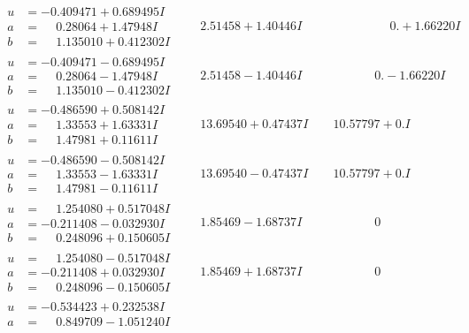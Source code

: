 \documentclass[1p]{elsarticle_modified}
\theoremstyle{definition}
\begin{document}
$$\begin{array}{c|c|c}
\begin{aligned}
u &= -0.409471 + 0.689495 I \\
a &= \phantom{-}0.28064 + 1.47948 I \\
b &= \phantom{-}1.135010 + 0.412302 I\end{aligned}
 & \phantom{-}2.51458 + 1.40446 I & \phantom{-0.000000 -}0. + 1.66220 I \\ \hline\begin{aligned}
u &= -0.409471 - 0.689495 I \\
a &= \phantom{-}0.28064 - 1.47948 I \\
b &= \phantom{-}1.135010 - 0.412302 I\end{aligned}
 & \phantom{-}2.51458 - 1.40446 I & \phantom{-0.000000 } 0. - 1.66220 I \\ \hline\begin{aligned}
u &= -0.486590 + 0.508142 I \\
a &= \phantom{-}1.33553 + 1.63331 I \\
b &= \phantom{-}1.47981 + 0.11611 I\end{aligned}
 & \phantom{-}13.69540 + 0.47437 I & \phantom{-}10.57797 + 0. I\phantom{ +0.000000I} \\ \hline\begin{aligned}
u &= -0.486590 - 0.508142 I \\
a &= \phantom{-}1.33553 - 1.63331 I \\
b &= \phantom{-}1.47981 - 0.11611 I\end{aligned}
 & \phantom{-}13.69540 - 0.47437 I & \phantom{-}10.57797 + 0. I\phantom{ +0.000000I} \\ \hline\begin{aligned}
u &= \phantom{-}1.254080 + 0.517048 I \\
a &= -0.211408 - 0.032930 I \\
b &= \phantom{-}0.248096 + 0.150605 I\end{aligned}
 & \phantom{-}1.85469 - 1.68737 I & \phantom{-0.000000 } 0 \\ \hline\begin{aligned}
u &= \phantom{-}1.254080 - 0.517048 I \\
a &= -0.211408 + 0.032930 I \\
b &= \phantom{-}0.248096 - 0.150605 I\end{aligned}
 & \phantom{-}1.85469 + 1.68737 I & \phantom{-0.000000 } 0 \\ \hline\begin{aligned}
u &= -0.534423 + 0.232538 I \\
a &= \phantom{-}0.849709 - 1.051240 I \\

\end{aligned}
\end{array}$$
\end{document}
